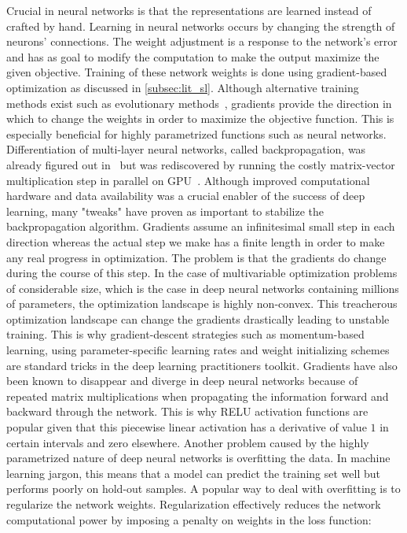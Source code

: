 Crucial in neural networks is that the representations are learned instead of crafted by hand. Learning in neural networks occurs by changing the strength of neurons' connections. The weight adjustment is a response to the network's error and has as goal to modify the computation to make the output maximize the given objective. Training of these network weights is done using gradient-based optimization as discussed in \cref{subsec:lit_sl}. Although alternative training methods exist such as evolutionary methods~\autocite{salimans2017evolution}, gradients provide the direction in which to change the weights in order to maximize the objective function. This is especially beneficial for highly parametrized functions such as neural networks. Differentiation of multi-layer neural networks, called backpropagation, was already figured out in~\autocite{rumelhart1986learning} but was rediscovered by running the costly matrix-vector multiplication step in parallel on \gls{GPU}~\autocite{gpu-nn}. Although improved computational hardware and data availability was a crucial enabler of the success of deep learning, many "tweaks" have proven as important to stabilize the backpropagation algorithm. Gradients assume an infinitesimal small step in each direction whereas the actual step we make has a finite length in order to make any real progress in optimization. The problem is that the gradients do change during the course of this step. In the case of multivariable optimization problems of considerable size, which is the case in deep neural networks containing millions of parameters, the optimization landscape is highly non-convex. This treacherous optimization landscape can change the gradients drastically leading to unstable training. This is why gradient-descent strategies such as momentum-based learning, using parameter-specific learning rates and weight initializing schemes are standard tricks in the deep learning practitioners toolkit. Gradients have also been known to disappear and diverge in deep neural networks because of repeated matrix multiplications when propagating the information forward and backward through the network. This is why \gls{RELU} activation functions are popular given that this piecewise linear activation has a derivative of value $1$ in certain intervals and zero elsewhere. Another problem caused by the highly parametrized nature of deep neural networks is overfitting the data. In machine learning jargon, this means that a model can predict the training set well but performs poorly on hold-out samples. A popular way to deal with overfitting is to regularize the network weights. Regularization effectively reduces the network computational power by imposing a penalty on weights in the loss function:
